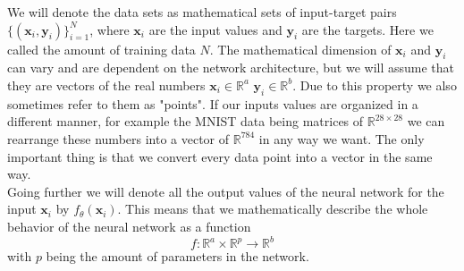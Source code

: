 We will denote the data sets as mathematical sets of input-target pairs $\{(\mathbf{x}_i, \mathbf{y}_i)\}_{i=1}^N$, where $\mathbf{x}_i$ are the input values and $\mathbf{y}_i$ are the targets. Here we called the amount of training data $N$. The mathematical dimension of $\mathbf{x}_i$ and $\mathbf{y}_i$ can vary and are dependent on the network architecture, but we will assume that they are vectors of the real numbers $\mathbf{x}_i \in \mathbb{R}^a$ $\mathbf{y}_i \in \mathbb{R}^b$. Due to this property we also sometimes refer to them as "points". If our inputs values are organized in a different manner, for example the MNIST data being matrices of $\mathbb{R}^{28\times28}$ we can rearrange these numbers into a vector of $\mathbb{R}^{784}$ in any way we want. The only important thing is that we convert every data point into a vector in the same way.\\
Going further we will denote all the output values of the neural network for the input $\mathbf{x}_i$ by $f_\theta(\mathbf{x}_i)$. This means that we mathematically describe the whole behavior of the neural network as a function
\begin{equation}
	f: \mathbb{R}^a \times \mathbb{R}^p \rightarrow \mathbb{R}^b
\end{equation}
with $p$ being the amount of parameters in the network.

